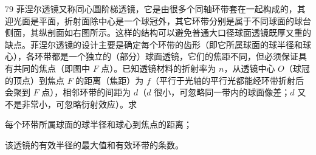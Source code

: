 \begin{problem}[第34届物理竞赛复赛][菲涅尔透镜]{79}
    菲涅尔透镜又称同心圆阶梯透镜，它是由很多个同轴环带套在一起构成的，其迎光面是平面，折射面除中心是一个球冠外，其它环带分别是属于不同球面的球台侧面，其纵剖面如右图所示。这样的结构可以避免普通大口径球面透镜既厚又重的缺点。菲涅尔透镜的设计主要是确定每个环带的齿形（即它所属球面的球半径和球心），各环带都是一个独立的（部分）球面透镜，它们的焦距不同，但必须保证具有共同的焦点（即图中 $F$ 点）。已知透镜材料的折射率为 $n$，从透镜中心 $O$（球冠的顶点）到焦点 $F$ 的距离（焦距）为 $f$（平行于光轴的平行光都能经环带折射后会聚到 $F$ 点），相邻环带的间距为 $d$（$d$ 很小，可忽略同一带内的球面像差；$d$ 又不是非常小，可忽略衍射效应）。求
    \begin{subproblem}
        每个环带所属球面的球半径和球心到焦点的距离；
    \end{subproblem}
    \begin{subproblem}
        该透镜的有效半径的最大值和有效环带的条数。
    \end{subproblem}
\end{problem}